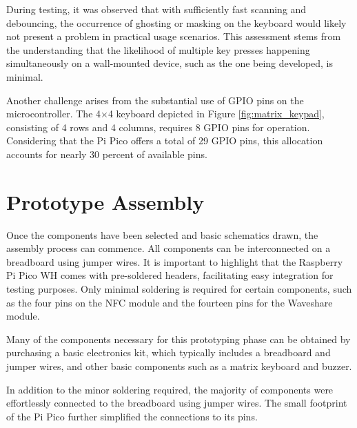 During testing, it was observed that with sufficiently fast scanning and debouncing, the occurrence of ghosting or masking on 
the keyboard would likely not present a problem in practical usage scenarios. This assessment stems from the understanding that 
the likelihood of multiple key presses happening simultaneously on a wall-mounted device, such as the one being developed, is 
minimal.

Another challenge arises from the substantial use of GPIO pins on the microcontroller. The 4$\times$4 keyboard depicted in 
Figure \ref{fig:matrix_keypad}, consisting of 4 rows and 4 columns, requires 8 GPIO pins for operation. Considering that the 
Pi Pico offers a total of 29 GPIO pins, this allocation accounts for nearly 30 percent of available pins.


%
%

\section{Prototype Assembly}

Once the components have been selected and basic schematics drawn, the assembly process can commence. All components can be 
interconnected on a breadboard using jumper wires. It is important to highlight that the Raspberry Pi Pico WH comes with 
pre-soldered headers, facilitating easy integration for testing purposes. Only minimal soldering is required for certain 
components, such as the four pins on the NFC module and the fourteen pins for the Waveshare module.

Many of the components necessary for this prototyping phase can be obtained by purchasing a basic electronics kit, which 
typically includes a breadboard and jumper wires, and other basic components such as a matrix keyboard and buzzer.

In addition to the minor soldering required, the majority of components were effortlessly connected to the breadboard 
using jumper wires. The small footprint of the Pi Pico further simplified the connections to its pins.

